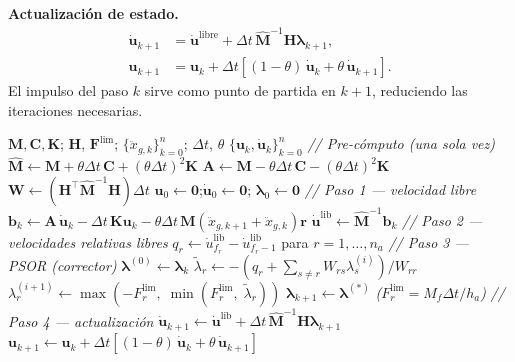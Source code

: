 \documentclass[preprint,12pt,authoryear]{elsarticle}
\newcommand{\Mf}{M_{\!f}}
\newcommand{\ha}{h_a}
\begin{document}
\textbf{Actualización de estado.}
\begin{align}
    \dot{\bm{u}}_{k+1} &= \dot{\bm{u}}^{\mathrm{libre}}
        + \Delta t\,\hat{\bm{M}}^{-1}\bm{H}\bm{\lambda}_{k+1}, \label{eq:vupdate}\\
    \bm{u}_{k+1} &= \bm{u}_k
        + \Delta t\!\left[(1-\theta)\,\dot{\bm{u}}_k
                         + \theta\,\dot{\bm{u}}_{k+1}\right]. \label{eq:uupdate}
\end{align}
El impulso del paso $k$ sirve como punto de partida en $k+1$, reduciendo
las iteraciones necesarias.

\begin{algorithm}[t]
\caption{NSD-LCP-PSOR aplicado a marcos MDOF con AFR}
\label{alg:nsd-lcp-psor}
\begin{algorithmic}[1]
\Require $\bm{M},\bm{C},\bm{K}$; $\bm{H}$, $\bm{F}^{\lim}$;
         $\{\ddot{x}_{g,k}\}_{k=0}^{n}$; $\Delta t$, $\theta$
\Ensure  $\{\bm{u}_k,\dot{\bm{u}}_k\}_{k=0}^{n}$
\vspace{2pt}
\State \textit{// Pre-cómputo (una sola vez)}
\State $\hat{\bm{M}} \leftarrow \bm{M} + \theta\Delta t\,\bm{C} + (\theta\Delta t)^{2}\bm{K}$
\State $\bm{A} \leftarrow \bm{M} - \theta\Delta t\,\bm{C} - (\theta\Delta t)^{2}\bm{K}$
\State $\bm{W} \leftarrow \left(\bm{H}^{\top}\hat{\bm{M}}^{-1}\bm{H}\right)\Delta t$
\State $\bm{u}_0 \leftarrow \bm{0}$;\quad $\dot{\bm{u}}_0 \leftarrow \bm{0}$;\quad
       $\bm{\lambda}_0 \leftarrow \bm{0}$
\vspace{2pt}
    \State \textit{// Paso 1 — velocidad libre}
    \State $\bm{b}_k \leftarrow \bm{A}\,\dot{\bm{u}}_k
            - \Delta t\,\bm{K}\bm{u}_k
            - \theta\Delta t\,\bm{M}\!\left(\ddot{x}_{g,k+1}+\ddot{x}_{g,k}\right)\bm{r}$
    \State $\dot{\bm{u}}^{\mathrm{lib}} \leftarrow \hat{\bm{M}}^{-1}\bm{b}_k$
    \State \textit{// Paso 2 — velocidades relativas libres}
    \State $q_r \leftarrow \dot{u}^{\mathrm{lib}}_{f_r} - \dot{u}^{\mathrm{lib}}_{f_r-1}$
           \quad para $r = 1,\ldots,n_a$
    \State \textit{// Paso 3 — PSOR (corrector)}
    \State $\bm{\lambda}^{(0)} \leftarrow \bm{\lambda}_k$
            \State $\tilde{\lambda}_r \leftarrow
                   -\!\left(q_r + \sum_{s \neq r} W_{rs}\lambda_s^{(i)}\right)\!\big/W_{rr}$
            \State $\lambda_r^{(i+1)} \leftarrow
                   \max\!\left(-F^{\lim}_r,\;\min\!\left(F^{\lim}_r,\;\tilde{\lambda}_r\right)\right)$
        \EndFor
    \EndWhile
    \State $\bm{\lambda}_{k+1} \leftarrow \bm{\lambda}^{(*)}$
           \quad\textit{($F^{\lim}_r = \Mf\Delta t/\ha$)}
    \State \textit{// Paso 4 — actualización}
    \State $\dot{\bm{u}}_{k+1} \leftarrow
           \dot{\bm{u}}^{\mathrm{lib}} +
           \Delta t\,\hat{\bm{M}}^{-1}\bm{H}\bm{\lambda}_{k+1}$
    \State $\bm{u}_{k+1} \leftarrow \bm{u}_k +
           \Delta t\!\left[(1-\theta)\,\dot{\bm{u}}_k +
                           \theta\,\dot{\bm{u}}_{k+1}\right]$
\EndFor
\end{algorithmic}
\end{algorithm}
\end{document}
